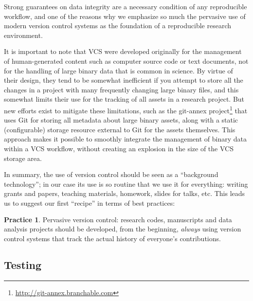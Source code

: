 \documentclass[ChapterTOCs,krantz2]{krantz} %
\theoremstyle{definition}
\newtheorem{practice}{Practice}
\begin{document}
Strong guarantees on data integrity are a necessary condition of any
reproducible workflow, and one of the reasons why we emphasize so much the
pervasive use of modern version control systems as the foundation of a
reproducible research environment.

It is important to note that VCS were developed originally for the
management of human-generated content such as computer source code or text
documents, not for the handling of large binary data that is common in science.
By virtue of their design, they tend to be somewhat inefficient if you attempt
to store all the changes in a project with many frequently changing large
binary files, and this somewhat limits their use for the tracking of all assets
in a research project.  But new efforts exist to mitigate these limitations,
such as the git-annex project\footnote{\url{http://git-annex.branchable.com}}
that uses Git for storing all metadata about large binary assets, along
with a static (configurable) storage resource external to Git for the assets
themselves.  This approach makes it possible to smoothly integrate the
management of binary data within a VCS workflow, without creating an explosion
in the size of the VCS storage area.

In summary, the use of version control should be seen as a ``background
technology''; in our case its use is so routine that we use it for everything:
writing grants and papers, teaching materials, homework, slides for talks, etc.
This leads us to suggest our first ``recipe'' in terms of best practices:

\begin{practice}
  Pervasive version control: research codes, manuscripts and data analysis
  projects should be developed, from the beginning, \emph{always} using version
  control systems that track the actual history of everyone's contributions.
\end{practice}

\subsection{Testing}
\end{document}
